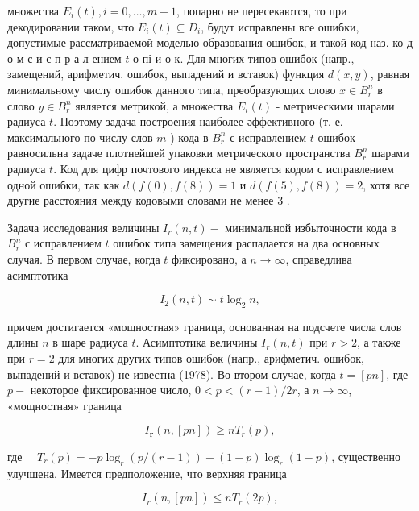\documentclass[10pt]{article}
\begin{document}
множества $E_{i}(t), i=0, \ldots, m-1$, попарно не пересекаются, то при декодировании таком, что $E_{i}(t) \subseteq D_{i}$, будут исправлены все ошибки, допустимые рассматриваемой моделью образования ошибок, и такой код наз. ко д о м с и с п р а л ением $t$ о пі и о к. Для многих типов ошибок (напр., замещений, арифметич. ошибок, выпадений и вставок) функция $d(x, y)$, равная минимальному числу ошибок данного типа, преобразующих слово $x \in B_{r}^{n}$ в слово $y \in B_{r}^{n}$ является метрикой, а множества $E_{i}(t)$ - метрическими шарами радиуса $t$. Поэтому задача построения наиболее әффективного (т. е. максимального по числу слов $m$ ) кода в $B_{r}^{n}$ с исправлением $t$ ошибок равносильна задаче плотнейшей упаковки метрического пространства $B_{r}^{n}$ шарами радиуса $t$. Код для цифр почтового индекса не является кодом с исправлением одной ошибки, так как $d(f(0), f(8))=1$ и $d(f(5), f(8))=2$, хотя все другие расстояния между кодовыми словами не менее 3 .



Задача исследования величины $I_{r}(n, t)-$ минимальной избыточности кода в $B_{r}^{n}$ с исправлением $t$ ошибок типа замещения распадается на два основных случая. В первом случае, когда $t$ фиксировано, а $n \rightarrow \infty$, справедлива асимптотика



\[

I_{2}(n, t) \sim t \log _{2} n,

\]



причем достигается «мощностная» граница, основанная на подсчете числа слов длины $n$ в шаре радиуса $t$. Асимптотика величины $I_{r}(n, t)$ при $r>2$, а также при $r=2$ для многих других типов ошибок (напр., арифметич. ошибок, выпадений и вставок) не известна (1978). Во втором случае, когда $t=[p n]$, где $p-$ некоторое фиксированное число, $0<p<(r-1) / 2 r$, а $n \rightarrow \infty$, «мощностная» граница



\[

I_{\boldsymbol{r}}(n,[p n]) \geqslant n T_{r}(p),

\]



где $\quad T_{r}(p)=-p \log _{r}(p /(r-1))-(1-p) \log _{r}(1-p)$, существенно улучшена. Имеется предположение, что верхняя граница



\[

I_{r}(n,[p n]) \leqslant n T_{r}(2 p),

\]
\end{document}
